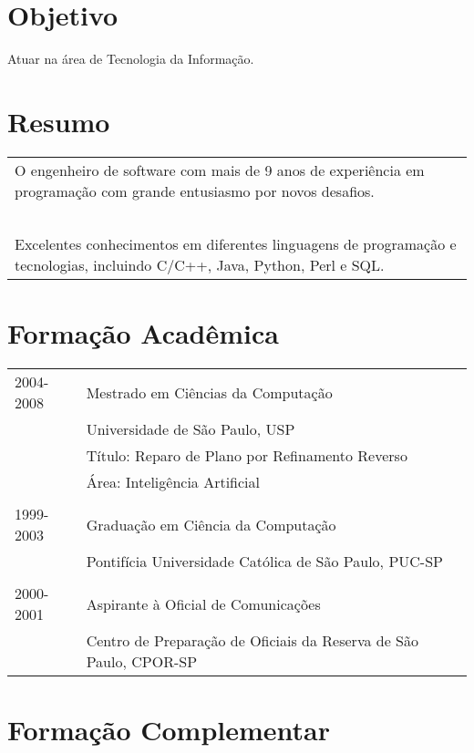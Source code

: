 \documentclass[a4paper, oneside, final]{scrartcl}
\begin{document}
\begin{center}
\textsc{\huge{}}\\ \ \\

\section{Objetivo}

Atuar na área de Tecnologia da Informação.

\section{Resumo}

\begin{tabularx}{0.97\linewidth}{X}
  O engenheiro de software com mais de 9 anos de experiência em programação com grande entusiasmo por novos desafios. \\ \ \\
  Excelentes conhecimentos em diferentes linguagens de programação e tecnologias, incluindo C/C++, Java, Python, Perl e SQL.
\end{tabularx}

\section{Formação Acadêmica}

\begin{tabularx}{0.97\linewidth}{p{2cm}X}
2004-2008   & Mestrado em Ciências da Computação\\
            & Universidade de São Paulo, USP\\
            & Título: Reparo de Plano por Refinamento Reverso\\
            & Área:  Inteligência Artificial\\ \\

1999-2003   & Graduação em Ciência da Computação\\
            & Pontifícia Universidade Católica de São Paulo, PUC-SP\\ \\

2000-2001   & Aspirante à Oficial de Comunicações\\
            & Centro de Preparação de Oficiais da Reserva de São Paulo, CPOR-SP
\end{tabularx}

\section{Formação Complementar}


\end{center}
\end{document}
